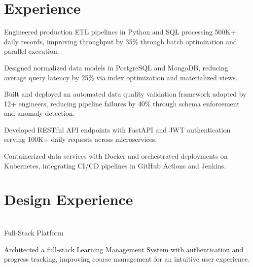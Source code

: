 \documentclass[letterpaper]{deedy-resume}
\begin{document}
\hfill
\begin{minipage}[t]{0.66\textwidth} 

\section{Experience}

\vspace{\topsep} 
\begin{tightemize}
    
    \item Engineered production ETL pipelines in Python and SQL processing 500K+ daily records, improving throughput by 35\% through batch optimization and parallel execution.
    
    \item Designed normalized data models in PostgreSQL and MongoDB, reducing average query latency by 25\% via index optimization and materialized views.
    
    \item Built and deployed an automated data quality validation framework adopted by 12+ engineers, reducing pipeline failures by 40\% through schema enforcement and anomaly detection.
    
    \item Developed RESTful API endpoints with FastAPI and JWT authentication serving 100K+ daily requests across microservices.
    
    \item Containerized data services with Docker and orchestrated deployments on Kubernetes, integrating CI/CD pipelines in GitHub Actions and Jenkins.
    
\end{tightemize}
\sectionsep 


\section{Design Experience}

 \\
Full-Stack Platform
\begin{tightemize}
    
    \item Architected a full-stack Learning Management System with authentication and progress tracking, improving course management for an intuitive user experience.
    

\end{tightemize}
\end{minipage}
\end{document}
